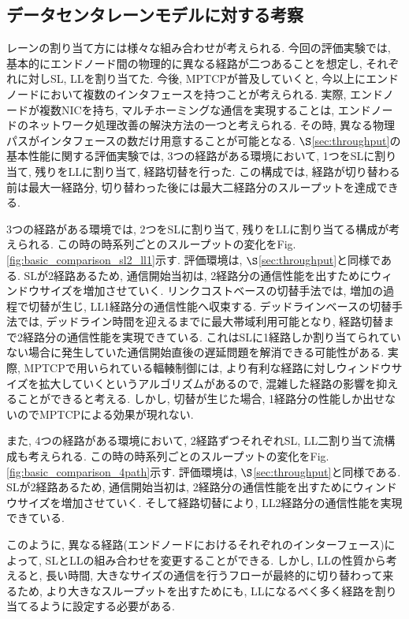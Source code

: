 \subsection{データセンタレーンモデルに対する考察}
レーンの割り当て方には様々な組み合わせが考えられる. 
今回の評価実験では, 基本的にエンドノード間の物理的に異なる経路が二つあることを想定し, それぞれに対しSL, LLを割り当てた. 
今後, MPTCPが普及していくと, 今以上にエンドノードにおいて複数のインタフェースを持つことが考えられる. 
実際, エンドノードが複数NICを持ち, マルチホーミングな通信を実現することは, エンドノードのネットワーク処理改善の解決方法の一つと考えられる. 
その時, 異なる物理パスがインタフェースの数だけ用意することが可能となる. 
$\S$\ref{sec:throughput}の基本性能に関する評価実験では, 3つの経路がある環境において, 1つをSLに割り当て,
残りをLLに割り当て, 経路切替を行った. 
この構成では, 経路が切り替わる前は最大一経路分, 切り替わった後には最大二経路分のスループットを達成できる. 

3つの経路がある環境では, 2つをSLに割り当て, 残りをLLに割り当てる構成が考えられる. 
この時の時系列ごとのスループットの変化をFig.\ref{fig:basic_comparison_sl2_ll1}示す.
評価環境は, $\S$\ref{sec:throughput}と同様である. 
SLが2経路あるため, 通信開始当初は, 2経路分の通信性能を出すためにウィンドウサイズを増加させていく. 
リンクコストベースの切替手法では, 増加の過程で切替が生じ, LL1経路分の通信性能へ収束する. 
デッドラインベースの切替手法では, デッドライン時間を迎えるまでに最大帯域利用可能となり, 経路切替まで2経路分の通信性能を実現できている. 
これはSLに1経路しか割り当てられていない場合に発生していた通信開始直後の遅延問題を解消できる可能性がある. 
実際, MPTCPで用いられている輻輳制御には, より有利な経路に対しウィンドウサイズを拡大していくというアルゴリズムがあるので,
混雑した経路の影響を抑えることができると考える. 
しかし, 切替が生じた場合, 1経路分の性能しか出せないのでMPTCPによる効果が現れない. 

また, 4つの経路がある環境において, 2経路ずつそれぞれSL, LL二割り当て流構成も考えられる. 
この時の時系列ごとのスループットの変化をFig.\ref{fig:basic_comparison_4path}示す.
評価環境は, $\S$\ref{sec:throughput}と同様である. 
SLが2経路あるため, 通信開始当初は, 2経路分の通信性能を出すためにウィンドウサイズを増加させていく. 
そして経路切替により, LL2経路分の通信性能を実現できている. 

このように, 異なる経路(エンドノードにおけるそれぞれのインターフェース)によって, SLとLLの組み合わせを変更することができる. 
しかし, LLの性質から考えると, 長い時間, 大きなサイズの通信を行うフローが最終的に切り替わって来るため, より大きなスループットを出すためにも,
LLになるべく多く経路を割り当てるように設定する必要がある. 

